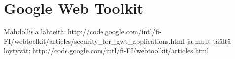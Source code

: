 \section{Google Web Toolkit}

Mahdollisia lähteitä: http://code.google.com/intl/fi-FI/webtoolkit/articles/security_for_gwt_applications.html ja muut täältä löytyvät: http://code.google.com/intl/fi-FI/webtoolkit/articles.html